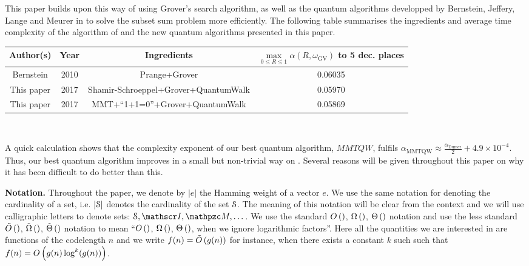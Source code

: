 This paper builds upon this way of using Grover's search algorithm, as well as the quantum algorithms developped by Bernstein, Jeffery, Lange and Meurer in \cite{BJLM13} to solve the subset sum problem more efficiently.
The following table summarises the ingredients and average time complexity of the  algorithm of \cite{B10} and the new quantum algorithms presented in this paper.
\begin{center}
      \begin{tabular}{| c | c | c | c |}
      \hline
      \textbf{Author(s)} & Year & Ingredients & $\underset{0 \leq R \leq 1}{\max}\alpha(R,\omega_{\text{GV}})$ to 5 dec. places\\
      \hline
      Bernstein \cite{B10} & 2010 & Prange+Grover & 0.06035 \\
      \hline
      This paper & 2017 & Shamir-Schroeppel+Grover+QuantumWalk & 0.05970 \\
      \hline
      This paper & 2017 & MMT+``1+1=0''+Grover+QuantumWalk & 0.05869 \\
      \hline
      \end{tabular}\\
  \end{center}
A quick calculation shows that the complexity exponent of our best quantum algorithm, $MMTQW$, fulfils $\alpha_{\text{MMTQW}} \approx \frac{\alpha_{\text{Dumer}}}{2} + 4.9 \times 10^{-4}$. Thus, our best quantum algorithm improves in a small but non-trivial way on \cite{B10}. Several reasons will be given throughout this paper on why it has been difficult to do better than this.

\noindent
{\bf Notation.} Throughout the paper, we denote by $|e|$ the Hamming weight of a vector $e$. We use the same notation for denoting the cardinality of a set, i.e. $|\mathcal{S}|$ denotes the cardinality of the set $\mathcal{S}$. 
The meaning of this notation  will be clear from the context
and we will use calligraphic letters to denote sets: $\zS,\sI,\zM,\dots$. 
We use the standard $O\left(  \right)$, $\Omega \left(  \right)$, $\Theta\left(  \right)$ notation and use the less standard 
$\tilde{O}\left(  \right)$, $\tilde{\Omega} \left(  \right)$, $\tilde{\Theta}\left(  \right)$ notation to mean ``$O\left(  \right)$, $\Omega \left(  \right)$, $\Theta\left(  \right)$, when we ignore logarithmic factors''. 
Here all the quantities we are interested in are functions of the codelength $n$ and we write 
$f(n) = \tilde{O}\left( g(n) \right)$ for instance, when there exists a constant $k$ such such that 
$f(n) = O\left( g(n) \log^k(g(n)) \right)$.
